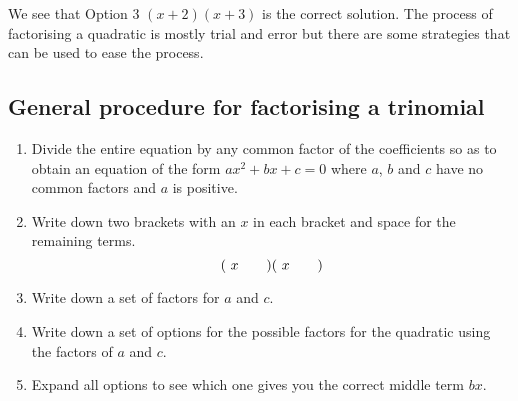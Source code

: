 \par
We see that Option 3 $(x+2)(x+3)$ is the correct solution. The process of factorising a quadratic is mostly trial and error but there are some strategies that can be used to ease the process.\par 



\subsection*{General procedure for factorising a trinomial}

\begin{enumerate}[itemsep=5pt, label=\textbf{\arabic*}. ] 
\item Divide the entire equation by any common factor of the coefficients so as to obtain an equation of the form $a{x}^{2}+bx+c=0$ where $a$, $b$ and $c$ have no common factors and $a$ is positive.
\item Write down two brackets with an $x$ in each bracket and space for the remaining terms.
\begin{equation*}
(\ x\phantom{\rule{2.em}{0ex}})(\ x\phantom{\rule{2.em}{0ex}})
\end{equation*}

\item Write down a set of factors for $a$ and $c$.
\item Write down a set of options for the possible factors for the quadratic using the factors of $a$ and $c$.
\item Expand all options to see which one gives you the correct middle term $bx$.
\end{enumerate}

